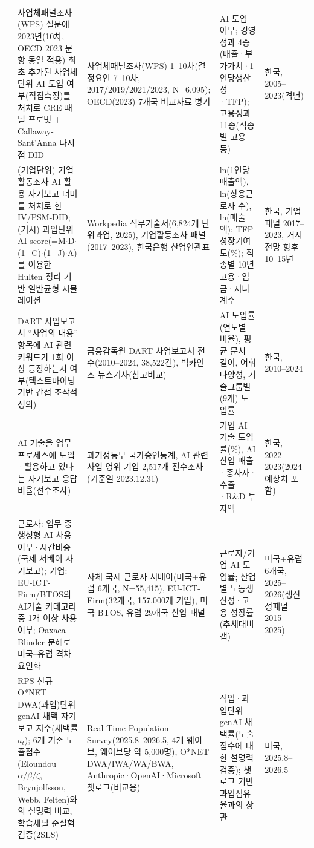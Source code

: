 \documentclass[11pt]{article}
\begin{document}
\begin{longtable}{L{2.3cm}L{4.1cm}L{3.6cm}L{2.6cm}L{2.3cm}}
\citet{lee-2025-ai-adoption-determinants-performance} &
사업체패널조사(WPS) 설문에 2023년(10차, OECD 2023 문항 동일 적용) 최초 추가된 사업체단위 AI 도입 여부(직접측정)를 처치로 CRE 패널 프로빗 + Callaway-Sant'Anna 다시점 DID &
사업체패널조사(WPS) 1--10차(결정요인 7--10차, 2017/2019/2021/2023, N=6,095); OECD(2023) 7개국 비교자료 병기 &
AI 도입 여부; 경영성과 4종(매출·부가가치·1인당생산성·TFP); 고용성과 11종(직종별 고용 등) &
한국, 2005--2023(격년)\\

\citet{nam-2026-ai-macroeconomic-impact-analysis} &
(기업단위) 기업활동조사 AI 활용 자기보고 더미를 처치로 한 IV/PSM-DID; (거시) 과업단위 AI score(=M$\cdot$D$\cdot$(1$-$C)$\cdot$(1$-$J)$\cdot$A)를 이용한 Hulten 정리 기반 일반균형 시뮬레이션 &
Workpedia 직무기술서(6,824개 단위과업, 2025), 기업활동조사 패널(2017--2023), 한국은행 산업연관표 &
ln(1인당 매출액), ln(상용근로자 수), ln(매출액); TFP 성장기여도(\%); 직종별 10년 고용·임금·지니계수 &
한국, 기업패널 2017--2023, 거시전망 향후 10--15년\\

\citet{seo-2025-ai-adoption-characteristics-business-reports} &
DART 사업보고서 ``사업의 내용'' 항목에 AI 관련 키워드가 1회 이상 등장하는지 여부(텍스트마이닝 기반 간접 조작적 정의) &
금융감독원 DART 사업보고서 전수(2010--2024, 38,522건), 빅카인즈 뉴스기사(참고비교) &
AI 도입률(연도별 비율), 평균 문서 길이, 어휘 다양성, 기술그룹별(9개) 도입률 &
한국, 2010--2024\\

\citet{spri-2024-ai-industry-survey} &
AI 기술을 업무 프로세스에 도입·활용하고 있다는 자기보고 응답 비율(전수조사) &
과기정통부 국가승인통계, AI 관련 사업 영위 기업 2,517개 전수조사(기준일 2023.12.31) &
기업 AI 기술 도입률(\%), AI 산업 매출·종사자·수출·R\&D 투자액 &
한국, 2022--2023(2024 예상치 포함)\\

\citet{bick-2026-mind-the-gap-ai-adoption} &
근로자: 업무 중 생성형 AI 사용 여부·시간비중(국제 서베이 자기보고); 기업: EU-ICT-Firm/BTOS의 AI기술 카테고리 중 1개 이상 사용 여부; Oaxaca-Blinder 분해로 미국--유럽 격차 요인화 &
자체 국제 근로자 서베이(미국+유럽 6개국, N=55,415), EU-ICT-Firm(32개국, 157,000개 기업), 미국 BTOS, 유럽 29개국 산업 패널 &
근로자/기업 AI 도입률; 산업별 노동생산성·고용 성장률(추세대비 갭) &
미국+유럽 6개국, 2025--2026(생산성패널 2015--2025)\\

\citet{bick-2026-what-work-does-generative} &
RPS 신규 O*NET DWA(과업)단위 genAI 채택 자기보고 지수(채택률 $a_t$); 6개 기존 노출점수(Eloundou $\alpha/\beta/\zeta$, Brynjolfsson, Webb, Felten)와의 설명력 비교, 학습채널 준실험 검증(2SLS) &
Real-Time Population Survey(2025.8--2026.5, 4개 웨이브, 웨이브당 약 5,000명), O*NET DWA/IWA/WA/BWA, Anthropic·OpenAI·Microsoft 챗로그(비교용) &
직업·과업단위 genAI 채택률(노출점수에 대한 설명력 검증); 챗로그 기반 과업점유율과의 상관 &
미국, 2025.8--2026.5\\
\end{longtable}
\end{document}
